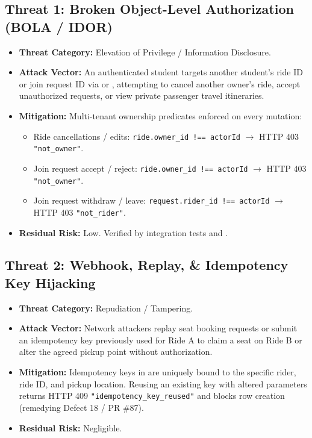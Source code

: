 \documentclass[10pt]{article}
\begin{document}
\subsection{Threat 1: Broken Object-Level Authorization (BOLA / IDOR)}
\begin{itemize}
  \item \textbf{Threat Category:} Elevation of Privilege / Information Disclosure.
  \item \textbf{Attack Vector:} An authenticated student targets another student's ride ID or join request ID via  or , attempting to cancel another owner's ride, accept unauthorized requests, or view private passenger travel itineraries.
  \item \textbf{Mitigation:} Multi-tenant ownership predicates enforced on every mutation:
    \begin{itemize}
      \item Ride cancellations / edits: \texttt{ride.owner\_id !== actorId} $\to$ HTTP 403 \texttt{"not\_owner"}.
      \item Join request accept / reject: \texttt{ride.owner\_id !== actorId} $\to$ HTTP 403 \texttt{"not\_owner"}.
      \item Join request withdraw / leave: \texttt{request.rider\_id !== actorId} $\to$ HTTP 403 \texttt{"not\_rider"}.
    \end{itemize}
  \item \textbf{Residual Risk:} Low. Verified by integration tests  and .
\end{itemize}

\subsection{Threat 2: Webhook, Replay, \& Idempotency Key Hijacking}
\begin{itemize}
  \item \textbf{Threat Category:} Repudiation / Tampering.
  \item \textbf{Attack Vector:} Network attackers replay seat booking requests or submit an idempotency key previously used for Ride A to claim a seat on Ride B or alter the agreed pickup point without authorization.
  \item \textbf{Mitigation:} Idempotency keys in  are uniquely bound to the specific rider, ride ID, and pickup location. Reusing an existing key with altered parameters returns HTTP 409 \texttt{"idempotency\_key\_reused"} and blocks row creation (remedying Defect 18 / PR \#87).
  \item \textbf{Residual Risk:} Negligible.
\end{itemize}
\end{document}
